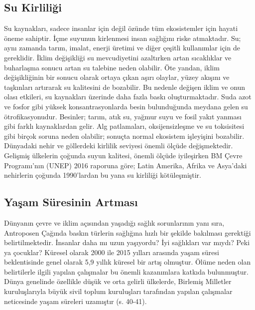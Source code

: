 \documentclass[
]{book}
\begin{document}
\hypertarget{su-kirliliux11fi}{%
\subsection{Su Kirliliği}\label{su-kirliliux11fi}}

Su kaynakları, sadece insanlar için değil özünde tüm ekosistemler için hayati öneme sahiptir. İçme suyunun kirlenmesi insan sağlığını riske atmaktadır. Su; aynı zamanda tarım, imalat, enerji üretimi ve diğer çeşitli kullanımlar için de gereklidir. İklim değişikliği su mevcudiyetini azaltırken artan sıcaklıklar ve buharlaşma sonucu artan su talebine neden olabilir. Öte yandan, iklim değişikliğinin bir sonucu olarak ortaya çıkan aşırı olaylar, yüzey akışını ve taşkınları artırarak su kalitesini de bozabilir. Bu nedenle değişen iklim ve onun olası etkileri, su kaynakları üzerinde daha fazla baskı oluşturmaktadır. Suda azot ve fosfor gibi yüksek konsantrasyonlarda besin bulunduğunda meydana gelen su ötrofikasyonudur. Besinler; tarım, atık su, yağmur suyu ve fosil yakıt yanması gibi farklı kaynaklardan gelir. Alg patlamaları, oksijensizleşme ve su toksisitesi gibi birçok soruna neden olabilir; sonuçta normal ekosistem işleyişini bozabilir. \citep{nazari2018climate}
Dünyadaki nehir ve göllerdeki kirlilik seviyesi önemli ölçüde değişmektedir. Gelişmiş ülkelerin çoğunda suyun kalitesi, önemli ölçüde iyileşirken BM Çevre Programı'nın (UNEP) 2016 raporuna göre; Latin Amerika, Afrika ve Asya'daki nehirlerin çoğunda 1990'lardan bu yana su kirliliği kötüleşmiştir. \citep{unep2016snapshot}

\hypertarget{yaux15fam-suxfcresinin-artmasux131}{%
\subsection{Yaşam Süresinin Artması}\label{yaux15fam-suxfcresinin-artmasux131}}

Dünyanın çevre ve iklim açısından yaşadığı sağlık sorunlarının yanı sıra, Antroposen Çağında baskın türlerin sağlığına hızlı bir şekilde bakılması gerektiği belirtilmektedir. İnsanlar daha mı uzun yaşıyordu? İyi sağlıkları var mıydı? Peki ya çocuklar? Küresel olarak 2000 ile 2015 yılları arasında yaşam süresi beklentisinde genel olarak 5,9 yıllık küresel bir artış olmuştur. Ölüme neden olan belirtilerle ilgili yapılan çalışmalar bu önemli kazanımlara katkıda bulunmuştur. Dünya genelinde özellikle düşük ve orta gelirli ülkelerde, Birlemiş Milletler kuruluşlarıyla büyük sivil toplum kuruluşları tarafından yapılan çalışmalar neticesinde yaşam süreleri uzamıştır (s. 40-41). \citep{bush2020}
\end{document}
